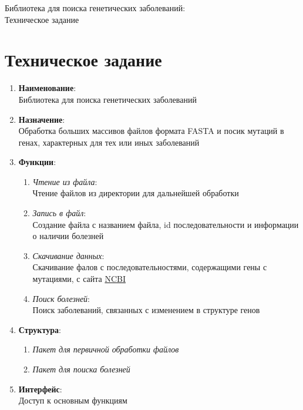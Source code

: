 \documentclass{article}
\begin{document}
    \begin{titlepage}
        \newpage
            \begin{center}
                \Large Библиотека для поиска генетических заболеваний:\\
                Техническое задание
            \end{center}
    \end{titlepage}
    
    \part{Техническое задание}
        \begin{enumerate}
          \item \textbf{Наименование}: \\Библиотека для поиска генетических заболеваний
          \item \textbf{Назначение}: \\Обработка больших массивов файлов формата FASTA и посик мутаций в генах, характерных для тех или иных заболеваний         
          \item \textbf{Функции}:
          \begin{enumerate}
              \item \emph{Чтение из файла}: \\Чтение файлов из директории для дальнейшей обработки
              \item \emph{Запись в файл}: \\Создание файла с названием файла, id последовательности и информации о наличии болезней
              \item \emph{Скачивание данных}: \\Скачивание фалов с последовательностями, содержащими гены с мутациями, с сайта \href{https://www.ncbi.nlm.nih.gov/nuccore}{NCBI}
              \item \emph{Поиск болезней}: \\Поиск заболеваний, связанных с изменением в структуре генов
          \end{enumerate}
          \item \textbf{Структура}:
         	 \begin{enumerate}
        		\item \emph{Пакет для первичной обработки файлов}
        		\item\emph{Пакет для поиска болезней}
         	 \end{enumerate}
          \item \textbf{Интерфейс}: \\Доступ к основным функциям
        \end{enumerate}
\end{document}
